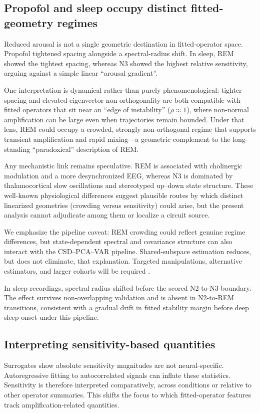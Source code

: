 \documentclass[preprint,12pt,nonatbib]{elsarticle}
\begin{document}
\subsection{Propofol and sleep occupy distinct fitted-geometry regimes}
Reduced arousal is not a single geometric destination in fitted-operator space. Propofol tightened spacing alongside a spectral-radius shift. In sleep, REM showed the tightest spacing, whereas N3 showed the highest relative sensitivity, arguing against a simple linear ``arousal gradient''.

One interpretation is dynamical rather than purely phenomenological: tighter spacing and elevated eigenvector non-orthogonality are both compatible with fitted operators that sit near an ``edge of instability'' ($\rho\approx 1$), where non-normal amplification can be large even when trajectories remain bounded. Under that lens, REM could occupy a crowded, strongly non-orthogonal regime that supports transient amplification and rapid mixing---a geometric complement to the long-standing ``paradoxical'' description of REM.

Any mechanistic link remains speculative. REM is associated with cholinergic modulation and a more desynchronized EEG, whereas N3 is dominated by thalamocortical slow oscillations and stereotyped up--down state structure. These well-known physiological differences suggest plausible routes by which distinct linearized geometries (crowding versus sensitivity) could arise, but the present analysis cannot adjudicate among them or localize a circuit source.

We emphasize the pipeline caveat: REM crowding could reflect genuine regime differences, but state-dependent spectral and covariance structure can also interact with the CSD--PCA--VAR pipeline. Shared-subspace estimation reduces, but does not eliminate, that explanation. Targeted manipulations, alternative estimators, and larger cohorts will be required \citep{Curic2024,Davila2025}.

In sleep recordings, spectral radius shifted before the scored N2-to-N3 boundary. The effect survives non-overlapping validation and is absent in N2-to-REM transitions, consistent with a gradual drift in fitted stability margin before deep sleep onset under this pipeline.

\subsection{Interpreting sensitivity-based quantities}
Surrogates show absolute sensitivity magnitudes are not neural-specific. Autoregressive fitting to autocorrelated signals can inflate these statistics. Sensitivity is therefore interpreted comparatively, across conditions or relative to other operator summaries. This shifts the focus to which fitted-operator features track amplification-related quantities.
\end{document}

